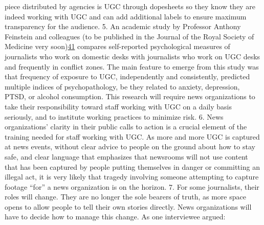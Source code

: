\documentclass[symmetric, notoc, nobib]{towcenter-book}
\begin{document}
piece distributed by agencies is UGC through dopesheets so they
know they are indeed working with UGC and can add additional
labels to ensure maximum transparency for the audience.
5. An academic study by Professor Anthony Feinstein and colleagues
(to be published in the Journal of the Royal Society of Medicine very
soon){\href{#endnotes}{41}} compares self-reported psychological measures of journalists
who work on domestic desks with journalists who work on UGC
desks and frequently in conflict zones. The main feature to emerge
from this study was that frequency of exposure to UGC, independently
and consistently, predicted multiple indices of psychopathology,
be they related to anxiety, depression, PTSD, or alcohol
consumption. This research will require news organizations to take
their responsibility toward staff working with UGC on a daily basis
seriously, and to institute working practices to minimize risk.
6. News organizations' clarity in their public calls to action is a crucial
element of the training needed for staff working with UGC. As
more and more UGC is captured at news events, without clear advice
to people on the ground about how to stay safe, and clear language
that emphasizes that newsrooms will not use content that has been
captured by people putting themselves in danger or committing an
illegal act, it is very likely that tragedy involving someone attempting
to capture footage ``for'' a news organization is on the horizon.
7. For some journalists, their roles will change. They are no longer
the sole bearers of truth, as more space opens to allow people to
tell their own stories directly. News organizations will have to decide
how to manage this change. As one interviewee argued:
\end{document}
